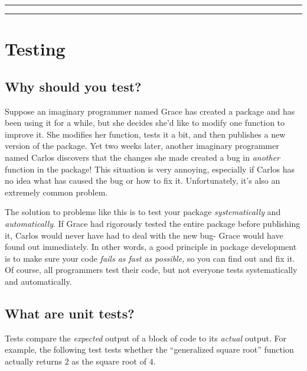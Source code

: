 \documentclass[
]{book}
\begin{document}
\begin{center}\rule{0.5\linewidth}{0.5pt}\end{center}

\begin{center}\rule{0.5\linewidth}{0.5pt}\end{center}

\hypertarget{testing}{%
\chapter{Testing}\label{testing}}

\hypertarget{why-should-you-test}{%
\section{Why should you test?}\label{why-should-you-test}}

Suppose an imaginary programmer named Grace has created a package and has been using it for a while, but she decides she'd like to modify one function to improve it. She modifies her function, tests it a bit, and then publishes a new version of the package. Yet two weeks later, another imaginary programmer named Carlos discovers that the changes she made created a bug in \emph{another} function in the package! This situation is very annoying, especially if Carlos has no idea what has caused the bug or how to fix it. Unfortunately, it's also an extremely common problem.

The solution to problems like this is to test your package \emph{systematically} and \emph{automatically}. If Grace had rigorously tested the entire package before publishing it, Carlos would never have had to deal with the new bug- Grace would have found out immediately. In other words, a good principle in package development is to make sure your code \emph{fails as fast as possible,} so you can find out and fix it. Of course, all programmers test their code, but not everyone tests systematically and automatically.

\hypertarget{what-are-unit-tests}{%
\section{What are unit tests?}\label{what-are-unit-tests}}

Tests compare the \emph{expected} output of a block of code to its \emph{actual} output. For example, the following test tests whether the ``generalized square root'' function actually returns \(2\) as the square root of \(4\).
\end{document}

